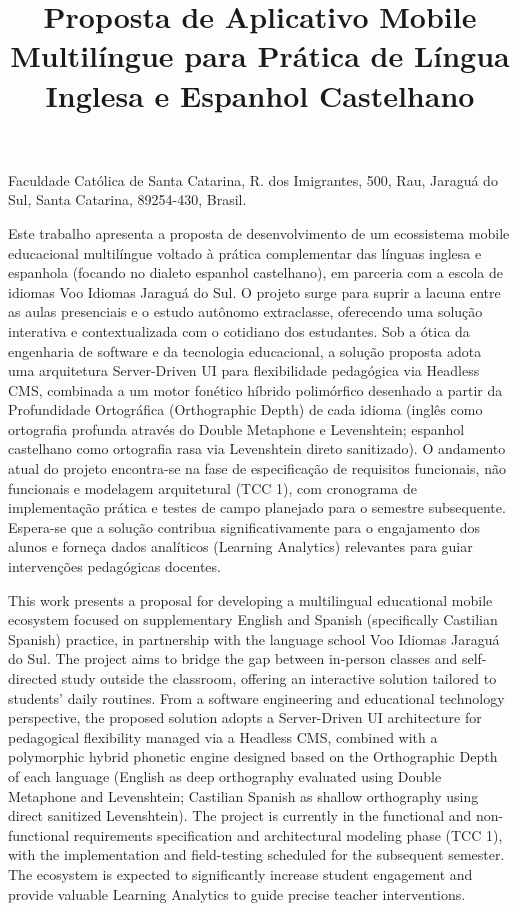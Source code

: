 \documentclass[portuguese]{sbcreviews-2025}%
\title[Proposta de Aplicativo Mobile Multilíngue para Prática de Idiomas]{Proposta de Aplicativo Mobile Multilíngue para Prática de Língua Inglesa e Espanhol Castelhano}
\author[Jeziel Nogueira 2026]{
\affil{\textbf{Jeziel Nogueira}~[{Católica de Santa Catarina}~|~\href{mailto:jeziel.nogueira@catolicasc.edu.br}{\textit{jeziel.nogueira@catolicasc.edu.br}}]}
}
\begin{document}
\begin{frontmatter}

\maketitle

\noindent Faculdade Católica de Santa Catarina, R. dos Imigrantes, 500, Rau, Jaraguá do Sul, Santa Catarina, 89254-430, Brasil.

\begin{abstract-pt}
Este trabalho apresenta a proposta de desenvolvimento de um ecossistema mobile educacional multilíngue voltado à prática complementar das línguas inglesa e espanhola (focando no dialeto espanhol castelhano), em parceria com a escola de idiomas Voo Idiomas Jaraguá do Sul. O projeto surge para suprir a lacuna entre as aulas presenciais e o estudo autônomo extraclasse, oferecendo uma solução interativa e contextualizada com o cotidiano dos estudantes. Sob a ótica da engenharia de software e da tecnologia educacional, a solução proposta adota uma arquitetura Server-Driven UI para flexibilidade pedagógica via Headless CMS, combinada a um motor fonético híbrido polimórfico desenhado a partir da Profundidade Ortográfica (Orthographic Depth) de cada idioma (inglês como ortografia profunda através do Double Metaphone e Levenshtein; espanhol castelhano como ortografia rasa via Levenshtein direto sanitizado). O andamento atual do projeto encontra-se na fase de especificação de requisitos funcionais, não funcionais e modelagem arquitetural (TCC 1), com cronograma de implementação prática e testes de campo planejado para o semestre subsequente. Espera-se que a solução contribua significativamente para o engajamento dos alunos e forneça dados analíticos (Learning Analytics) relevantes para guiar intervenções pedagógicas docentes.
\end{abstract-pt}

\begin{abstract-en}
This work presents a proposal for developing a multilingual educational mobile ecosystem focused on supplementary English and Spanish (specifically Castilian Spanish) practice, in partnership with the language school Voo Idiomas Jaraguá do Sul. The project aims to bridge the gap between in-person classes and self-directed study outside the classroom, offering an interactive solution tailored to students' daily routines. From a software engineering and educational technology perspective, the proposed solution adopts a Server-Driven UI architecture for pedagogical flexibility managed via a Headless CMS, combined with a polymorphic hybrid phonetic engine designed based on the Orthographic Depth of each language (English as deep orthography evaluated using Double Metaphone and Levenshtein; Castilian Spanish as shallow orthography using direct sanitized Levenshtein). The project is currently in the functional and non-functional requirements specification and architectural modeling phase (TCC 1), with the implementation and field-testing scheduled for the subsequent semester. The ecosystem is expected to significantly increase student engagement and provide valuable Learning Analytics to guide precise teacher interventions.
\end{abstract-en}


\end{frontmatter}
\end{document}
